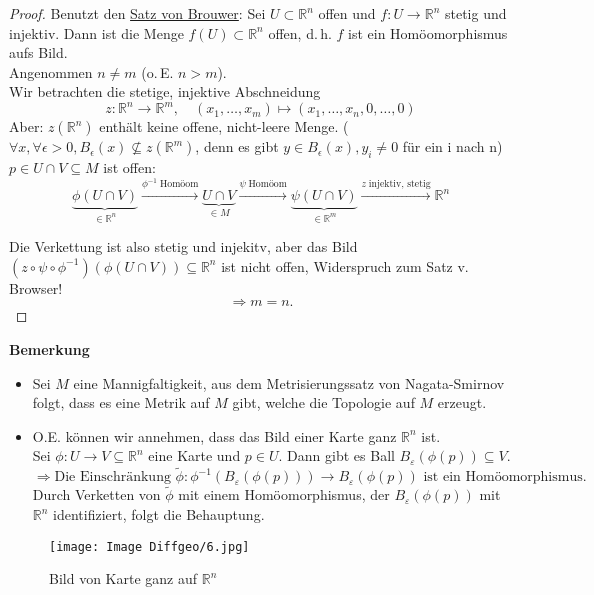 \documentclass[fleqn, 12pt, letterpaper]{article}
\newcommand{\txt}[1]{\text{#1}}
\begin{document}
\begin{proof}
	Benutzt den \underline{Satz von Brouwer}: Sei $U \subset \mathbb{R}^n$ offen und $f: U \to \mathbb{R}^n$ stetig und injektiv. Dann ist die Menge $f(U) \subset \mathbb{R}^n$ offen, d.\,h. $f$ ist ein Homöomorphismus aufs Bild.\\

    Angenommen $n \neq m$ (o.\,E. $n > m$).\\
    Wir betrachten die stetige, injektive Abschneidung
    \[
    z: \mathbb{R}^n \to \mathbb{R}^m, \quad (x_1, \dots, x_m) \mapsto (x_1, \dots, x_n,0, \dots, 0)
    \]
    Aber: $z(\mathbb{R}^n)$ enthält keine offene, nicht-leere Menge. ($\forall x, \forall \epsilon>0, B_{\epsilon}(x)\nsubseteq z(\mathbb{R}^m)$, denn es gibt $y\in B_{\epsilon}(x), y_i\neq 0$ für ein i nach n)\\

	\( p \in U\cap V\subseteq M\) ist offen:
    \[
    \underbrace{\phi(U\cap V)}_{\in \mathbb{R}^n} \xrightarrow{\phi^{-1} \;\txt{Homöom}} \underbrace{U\cap V}_{\in M} \xrightarrow{\psi \;\txt{Homöom}} \underbrace{\psi(U\cap V)}_{\in \mathbb{R}^m}     \xrightarrow{z \;\txt{injektiv, stetig}} \mathbb{R}^n
    \]

    Die Verkettung ist also stetig und injekitv, aber das Bild $(z\circ \psi\circ\phi^{-1})(\phi(U\cap V))\subseteq \mathbb{R}^n$ ist nicht offen, Widerspruch zum Satz v. Browser!\\
    \[
    \Rightarrow m = n.
    \]
\end{proof}

\textbf{Bemerkung}
\begin{itemize}
    \item Sei $M$ eine Mannigfaltigkeit, aus dem Metrisierungssatz von Nagata-Smirnov folgt, dass es eine Metrik auf $M$ gibt, welche die Topologie auf $M$ erzeugt.
    
    \item O.E. können wir annehmen, dass das Bild einer Karte ganz $\mathbb{R}^n$ ist. \\
    Sei $\phi : U \rightarrow V \subseteq \mathbb{R}^n$ eine Karte und $p \in U$. Dann gibt es Ball $B_\varepsilon(\phi(p)) \subseteq V$.
    \[
        \Rightarrow \text{Die Einschränkung } \widetilde{\phi} : \phi^{-1}(B_\varepsilon(\phi(p))) \rightarrow B_\varepsilon(\phi(p)) \text{ ist ein Homöomorphismus.}
    \]
    Durch Verketten von $\widetilde{\phi}$ mit einem Homöomorphismus, der $B_\varepsilon(\phi(p))$ mit $\mathbb{R}^n$ identifiziert, folgt die Behauptung.
\end{itemize}
\begin{figure}[H]
    \centering
    \texttt{[image: Image Diffgeo/6.jpg]}
	\caption{Bild von Karte ganz auf $\mathbb{R}^n$}
 \end{figure}
\end{document}
